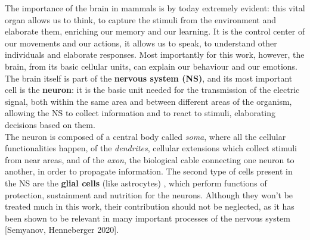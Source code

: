 \documentclass[a4paper]{article}
\begin{document}
	The importance of the brain in mammals is by today extremely evident: this vital organ allows us to think,  to capture the stimuli from the environment and elaborate them, enriching our memory and  our learning. It is the control center of our movements and our actions, it allows us to speak, to understand other individuals and elaborate responses. Most importantly for this work, however, the brain, from its basic cellular units, can explain our behaviour and our emotions. \\
	
	The brain itself is part of the \textbf{nervous system (NS)}, and its most important cell is the \textbf{neuron}: it is the basic unit needed for the transmission of the electric signal, both within the same area and between different areas of the organism, allowing the NS to collect information and to react to stimuli, elaborating decisions based on them. \\
	The neuron is composed of a central body called \textit{soma}, where all the cellular functionalities happen, of the \textit{dendrites}, cellular extensions which collect stimuli from near areas, and of the \textit{axon}, the biological cable connecting one neuron to another, in order to propagate information. 
	The second type of cells present in the NS are the \textbf{glial cells} (like astrocytes) , which perform functions of protection, sustainment and nutrition for the neurons. Although they won't be treated much in this work, their contribution should not be neglected, as it has been shown to be relevant in many important processes of the nervous system [Semyanov, Henneberger 2020]. \\
	
		
	
\end{document}
